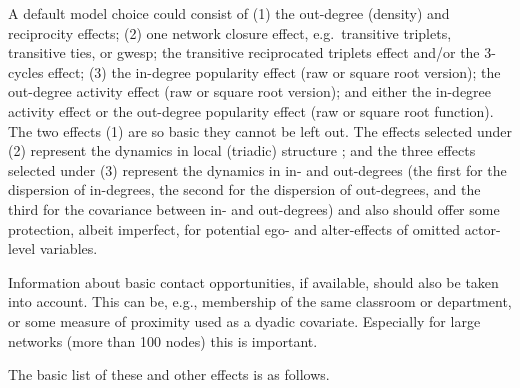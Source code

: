 \documentclass[a4paper,fleqn,11pt]{article}
\newcommand{\+}{\, + \,}
\begin{document}
A default model choice could consist of (1) the out-degree (density)
and reciprocity effects; (2) one network closure effect,
e.g.\ transitive triplets, transitive ties, or gwesp;
the transitive reciprocated triplets effect
and/or the 3-cycles effect;
(3) the in-degree popularity effect (raw or square root version);
the out-degree activity effect (raw or square root version);
and either the in-degree activity effect or the out-degree popularity effect
(raw or square root function).
The two effects (1) are so basic they cannot be left out.
The effects selected under (2) represent the dynamics in local (triadic) structure
\citep[also see][for the transitive reciprocated triplets effect]{Block2015};
and the three effects selected under (3) represent the dynamics
in in- and out-degrees (the first for the dispersion of in-degrees,
the second for the dispersion of out-degrees, and the third for the
covariance between in- and out-degrees) and also should offer
some protection, albeit imperfect, for potential ego- and alter-effects
of omitted actor-level variables.

Information about basic contact opportunities, if available,
should also be taken into account. This can be, e.g., membership
of the same classroom or department, or some measure of
proximity used as a dyadic covariate. Especially for large networks
(more than 100 nodes) this is important.

The basic list of these and other effects is as follows.
\end{document}
